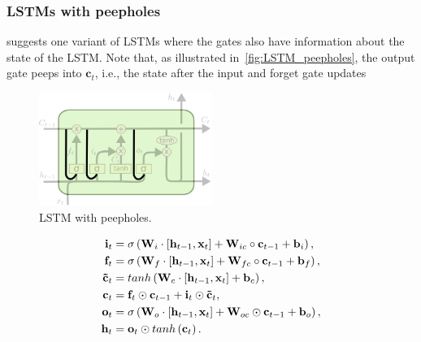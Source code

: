 \subsubsection{LSTMs with peepholes}

\cite{gers2000recurrent} suggests one variant of LSTMs where the gates also
have information about the state of the LSTM. Note that, as illustrated
in~\autoref{fig:LSTM_peepholes}, the output gate peeps into $\mathbf{c}_t$,
i.e., the state after the input and forget gate updates

\begin{figure}[p]
    \centering
    \includegraphics[width=0.5\textwidth]{pdf/LSTM_peepholes.pdf}
    \caption{LSTM with peepholes.\label{fig:LSTM_peepholes}}
\end{figure}

\begin{equation}\label{eq:LSTM_peepholes}
\begin{split}
    \mathbf{i}_t &= \sigma\left(\mathbf{W}_i \cdot \left[\mathbf{h}_{t-1},
        \mathbf{x}_t\right] + \mathbf{W}_{ic} \circ \mathbf{c}_{t-1} +
        \mathbf{b}_i \right),\\
    \mathbf{f}_t &= \sigma\left(\mathbf{W}_f \cdot \left[\mathbf{h}_{t-1},
        \mathbf{x}_t\right] + \mathbf{W}_{fc} \circ \mathbf{c}_{t-1} +
        \mathbf{b}_f \right),\\
    \mathbf{\tilde c}_t &= tanh \left(\mathbf{W}_c \cdot
        \left[\mathbf{h}_{t-1}, \mathbf{x}_t\right] + \mathbf{b}_c \right),\\
    \mathbf{c}_t &= \mathbf{f}_t \odot \mathbf{c}_{t-1} + \mathbf{i}_t
        \odot \mathbf{\tilde c}_t,\\
    \mathbf{o}_t &= \sigma\left(\mathbf{W}_o \cdot \left[\mathbf{h}_{t-1},
        \mathbf{x}_t\right] + \mathbf{W}_{oc} \odot \mathbf{c}_{t-1} +
        \mathbf{b}_o \right),\\
    \mathbf{h}_t &= \mathbf{o}_t \odot tanh \left(\mathbf{c}_t\right).
\end{split}
\end{equation}


